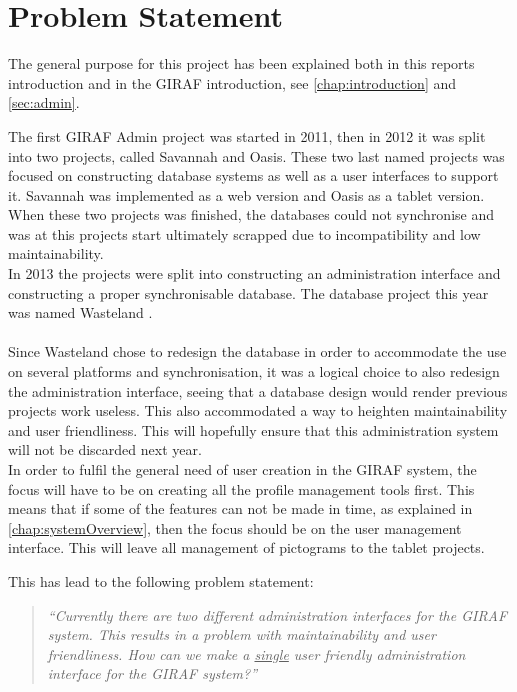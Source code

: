 \chapter{Problem Statement}
The general purpose for this project has been explained both in this reports introduction and in the GIRAF introduction, see \ref{chap:introduction} and \ref{sec:admin}.

The first GIRAF Admin project was started in 2011, then in 2012 it was split into two projects, called Savannah and Oasis. These two last named projects was focused on constructing database systems as well as a user interfaces to support it. Savannah was implemented as a web version and Oasis as a tablet version. When these two projects was finished, the databases could not synchronise and was at this projects start ultimately scrapped due to incompatibility and low maintainability.\\
In 2013 the projects were split into constructing an administration interface and constructing a proper synchronisable database. The database project this year was named Wasteland \citep{wasteland}.\\
\\

Since Wasteland chose to redesign the database in order to accommodate the use on several platforms and synchronisation, it was a logical choice to also redesign the administration interface, seeing that a database design would render previous projects work useless. This also accommodated a way to heighten maintainability and user friendliness. This will hopefully ensure that this administration system will not be discarded next year.\\
In order to fulfil the general need of user creation in the GIRAF system, the focus will have to be on creating all the profile management tools first. This means that if some of the features can not be made in time, as explained in \vref{chap:systemOverview}, then the focus should be on the user management interface. This will leave all management of pictograms to the tablet projects.

This has lead to the following problem statement:
\begin{verse}
\textit{``Currently there are two different administration interfaces for the GIRAF system.
This results in a problem with maintainability and user friendliness.
How can we make a \underline{single} user friendly administration interface for the GIRAF system?''}
\end{verse}
